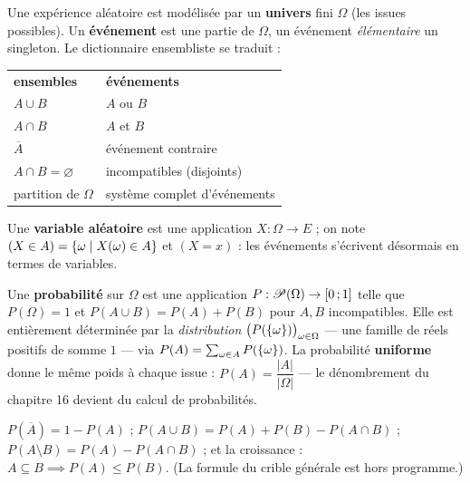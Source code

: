 \begin{definition}
Une expérience aléatoire est modélisée par un \textbf{univers} fini
$\Omega$ (les issues possibles). Un \textbf{événement} est une partie de
$\Omega$, un événement \emph{élémentaire} un singleton. Le dictionnaire
ensembliste se traduit :
\begin{center}
\begin{tabularx}{0.9\linewidth}{@{}>{\centering\arraybackslash}X>{\centering\arraybackslash}X@{}}
\textbf{ensembles} & \textbf{événements}\\[0.4mm]
$A\cup B$ & $A$ ou $B$\\
$A\cap B$ & $A$ et $B$\\
$\overline A$ & événement contraire\\
$A\cap B=\varnothing$ & incompatibles (disjoints)\\
partition de $\Omega$ & système complet d'événements\\
\end{tabularx}
\end{center}
Une \textbf{variable aléatoire} est une application $X:\Omega\to E$ ; on
note $(X\in A)=\left\{\omega\mid X(\omega)\in A\right\}$ et $(X=x)$ : les
événements s'écrivent désormais en termes de variables.
\end{definition}


\begin{definition}[Probabilité]
Une \textbf{probabilité} sur $\Omega$ est une application
$P:\mathscr{P}(\Omega)\to\mathopen{[}0\,{;}\,1\mathclose{]}$ telle que $P(\Omega)=1$ et
$P(A\cup B)=P(A)+P(B)$ pour $A,B$ incompatibles. Elle est entièrement
déterminée par la \emph{distribution} $\bigl(P(\left\{\omega\right\})\bigr)_{\omega\in\Omega}$ —
une famille de réels positifs de somme $1$ — via
$P(A)=\sum_{\omega\in A}P(\left\{\omega\right\})$. La probabilité
\textbf{uniforme} donne le même poids à chaque issue :
$P(A)=\dfrac{|A|}{|\Omega|}$ — le dénombrement du chapitre 16 devient du
calcul de probabilités.
\end{definition}

\begin{propriete}
$P(\overline A)=1-P(A)$ ;
$P(A\cup B)=P(A)+P(B)-P(A\cap B)$ ;
$P(A\setminus B)=P(A)-P(A\cap B)$ ; et la croissance :
$A\subseteq B\implies P(A)\leqslant P(B)$. (La formule du crible générale
est hors programme.)
\end{propriete}


